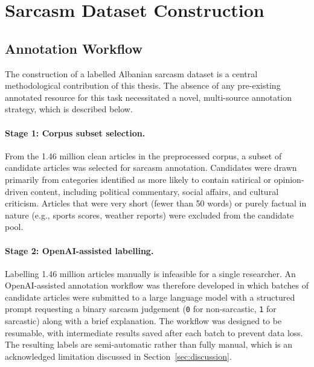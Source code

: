 \documentclass[12pt,a4paper]{article}
\begin{document}
\newpage
\section{Sarcasm Dataset Construction}
\label{sec:dataset_construction}

\subsection{Annotation Workflow}
\label{subsec:annotation}

The construction of a labelled Albanian sarcasm dataset is a central methodological contribution of this thesis. The absence of any pre-existing annotated resource for this task necessitated a novel, multi-source annotation strategy, which is described below.

\paragraph{Stage 1: Corpus subset selection.}
From the 1.46 million clean articles in the preprocessed corpus, a subset of candidate articles was selected for sarcasm annotation. Candidates were drawn primarily from categories identified as more likely to contain satirical or opinion-driven content, including political commentary, social affairs, and cultural criticism. Articles that were very short (fewer than 50 words) or purely factual in nature (e.g., sports scores, weather reports) were excluded from the candidate pool.

\paragraph{Stage 2: OpenAI-assisted labelling.}
Labelling 1.46 million articles manually is infeasible for a single researcher. An OpenAI-assisted annotation workflow was therefore developed in which batches of candidate articles were submitted to a large language model with a structured prompt requesting a binary sarcasm judgement (\texttt{0} for non-sarcastic, \texttt{1} for sarcastic) along with a brief explanation. The workflow was designed to be resumable, with intermediate results saved after each batch to prevent data loss. The resulting labels are semi-automatic rather than fully manual, which is an acknowledged limitation discussed in Section~\ref{sec:discussion}.
\end{document}
